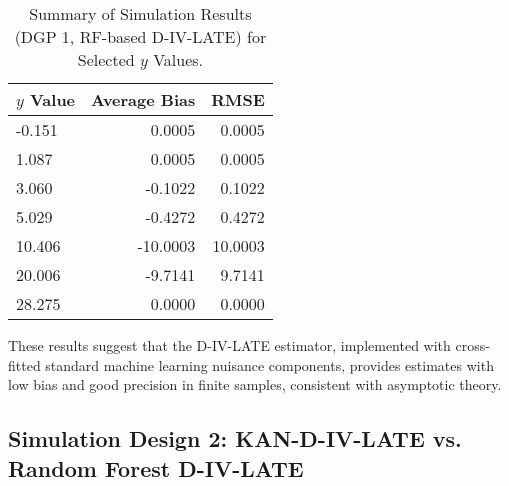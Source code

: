 \documentclass[final,3p,fleqn, 10pt]{elsarticle}
\begin{document}
\begin{table}[htbp]
\centering
\caption{Summary of Simulation Results (DGP 1, RF-based D-IV-LATE) for Selected $y$ Values.}
\label{tab:sim_results_summary_dgp1}
\begin{tabular}{@{}lrr@{}}
\toprule
$y$ Value & Average Bias & RMSE \\
\midrule
-0.151  & 0.0005  & 0.0005 \\
1.087   & 0.0005  & 0.0005 \\
3.060   & -0.1022 & 0.1022 \\
5.029   & -0.4272 & 0.4272 \\
10.406  & -10.0003 & 10.0003 \\
20.006  & -9.7141 & 9.7141 \\
28.275  & 0.0000  & 0.0000 \\
\bottomrule
\end{tabular}
\end{table}
These results suggest that the D-IV-LATE estimator, implemented with cross-fitted standard machine learning nuisance components, provides estimates with low bias and good precision in finite samples, consistent with asymptotic theory.

\subsection{Simulation Design 2: KAN-D-IV-LATE vs. Random Forest D-IV-LATE}
\label{subsec:sim_dgp2}
\end{document}
